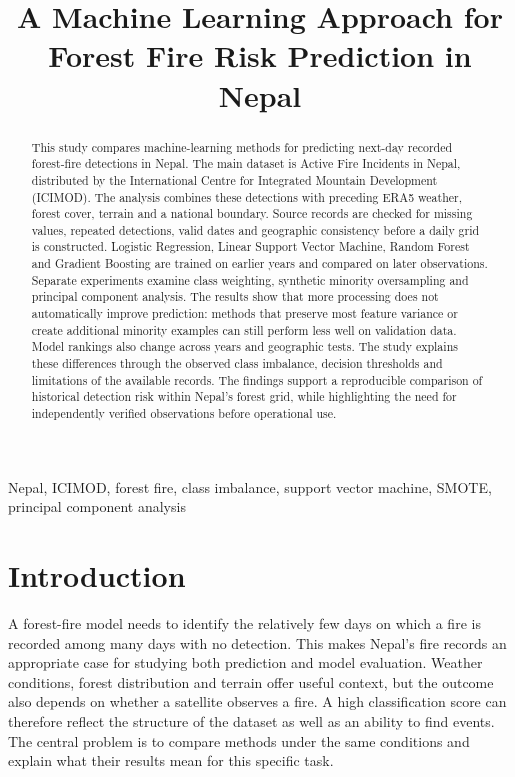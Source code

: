 \documentclass[conference,a4paper]{IEEEtran}
\title{A Machine Learning Approach for Forest Fire Risk Prediction in Nepal}
\author{\IEEEauthorblockN{Krijal Shrestha}\IEEEauthorblockA{Coventry ID: 11495103\\STW7072CEM Machine Learning\\Softwarica College of IT and E-commerce, Coventry University}}
\begin{document}
\maketitle
\begin{abstract}
This study compares machine-learning methods for predicting next-day recorded forest-fire detections in Nepal. The main dataset is Active Fire Incidents in Nepal, distributed by the International Centre for Integrated Mountain Development (ICIMOD). The analysis combines these detections with preceding ERA5 weather, forest cover, terrain and a national boundary. Source records are checked for missing values, repeated detections, valid dates and geographic consistency before a daily grid is constructed. Logistic Regression, Linear Support Vector Machine, Random Forest and Gradient Boosting are trained on earlier years and compared on later observations. Separate experiments examine class weighting, synthetic minority oversampling and principal component analysis. The results show that more processing does not automatically improve prediction: methods that preserve most feature variance or create additional minority examples can still perform less well on validation data. Model rankings also change across years and geographic tests. The study explains these differences through the observed class imbalance, decision thresholds and limitations of the available records. The findings support a reproducible comparison of historical detection risk within Nepal's forest grid, while highlighting the need for independently verified observations before operational use.
\end{abstract}
\begin{IEEEkeywords}
Nepal, ICIMOD, forest fire, class imbalance, support vector machine, SMOTE, principal component analysis
\end{IEEEkeywords}

\section{Introduction}
A forest-fire model needs to identify the relatively few days on which a fire is recorded among many days with no detection. This makes Nepal's fire records an appropriate case for studying both prediction and model evaluation. Weather conditions, forest distribution and terrain offer useful context, but the outcome also depends on whether a satellite observes a fire. A high classification score can therefore reflect the structure of the dataset as well as an ability to find events. The central problem is to compare methods under the same conditions and explain what their results mean for this specific task.
\end{document}
